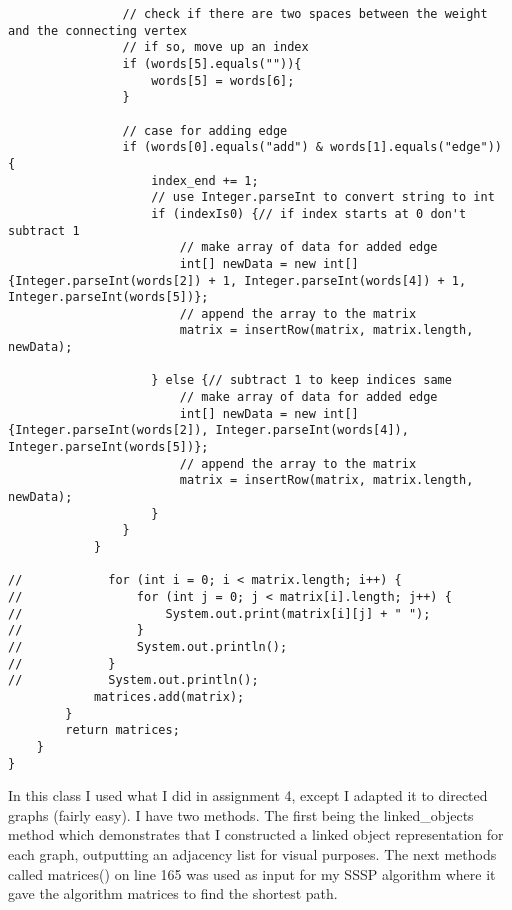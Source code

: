 \documentclass{article}
\begin{document}
\begin{lstlisting}
                // check if there are two spaces between the weight and the connecting vertex
                // if so, move up an index
                if (words[5].equals("")){
                    words[5] = words[6];
                }

                // case for adding edge
                if (words[0].equals("add") & words[1].equals("edge")) {
                    index_end += 1;
                    // use Integer.parseInt to convert string to int
                    if (indexIs0) {// if index starts at 0 don't subtract 1
                        // make array of data for added edge
                        int[] newData = new int[]{Integer.parseInt(words[2]) + 1, Integer.parseInt(words[4]) + 1, Integer.parseInt(words[5])};
                        // append the array to the matrix
                        matrix = insertRow(matrix, matrix.length, newData);

                    } else {// subtract 1 to keep indices same
                        // make array of data for added edge
                        int[] newData = new int[]{Integer.parseInt(words[2]), Integer.parseInt(words[4]), Integer.parseInt(words[5])};
                        // append the array to the matrix
                        matrix = insertRow(matrix, matrix.length, newData);
                    }
                }
            }

//            for (int i = 0; i < matrix.length; i++) {
//                for (int j = 0; j < matrix[i].length; j++) {
//                    System.out.print(matrix[i][j] + " ");
//                }
//                System.out.println();
//            }
//            System.out.println();
            matrices.add(matrix);
        }
        return matrices;
    }
}

\end{lstlisting}

In this class I used what I did in assignment 4, except I adapted it to directed graphs (fairly easy).  I have two methods. The first being the linked\_objects method which demonstrates that I constructed a linked object representation for each graph, outputting an adjacency list for visual purposes. The next methods called matrices() on line 165 was used as input for my SSSP algorithm where it gave the algorithm matrices to find the shortest path.
\end{document}
